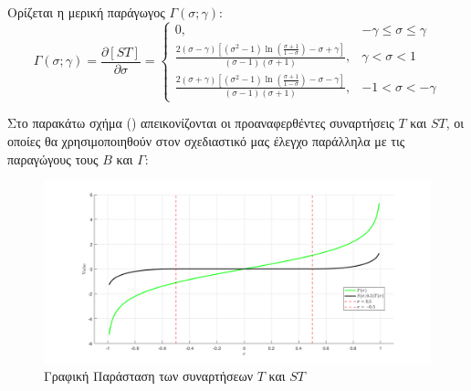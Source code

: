 \bigskip
\begin{definition} \label{Gamma_function_def}
Oρίζεται η μερική παράγωγος \( \Gamma(\sigma; \gamma) \):
\begin{equation}
  \Gamma(\sigma; \gamma) = \frac{\partial [S T]}{\partial \sigma} =
  \begin{cases}
    0,                                                                                                                                                               & -\gamma \leq \sigma \leq \gamma \\[0.3cm]
    \displaystyle \frac{2(\sigma - \gamma)\left[ (\sigma^2 - 1)\ln\left( \frac{\sigma + 1}{1 - \sigma} \right) - \sigma + \gamma \right]}{(\sigma - 1)(\sigma + 1)}, & \gamma < \sigma < 1             \\[0.5cm]
    \displaystyle \frac{2(\sigma + \gamma)\left[ (\sigma^2 - 1)\ln\left( \frac{\sigma + 1}{1 - \sigma} \right) - \sigma - \gamma \right]}{(\sigma - 1)(\sigma + 1)}, & -1 < \sigma < -\gamma
  \end{cases} \label{Gamma_function}
\end{equation}
\end{definition}

\bigskip
Στο παρακάτω σχήμα () απεικονίζονται οι προαναφερθέντες συναρτήσεις $T$ και $ST$, οι οποίες θα χρησιμοποιηθούν στον σχεδιαστικό μας έλεγχο παράλληλα με τις παραγώγους τους $B$ και $\Gamma$:

\begin{figure}[!ht]
	\centering
		\includegraphics[width=1\linewidth]{Chapters/Chapter2/Figures/functions_plots.png}
	\caption[Γραφική Παράσταση των συναρτήσεων $T$ και $ST$]{Γραφική Παράσταση των συναρτήσεων $T$ και $ST$}
	\label{fig:functions_plots}
\end{figure}

